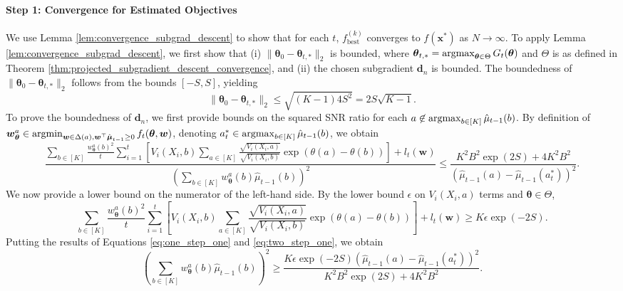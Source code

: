 \documentclass{article}
\begin{document}
\begin{appendices}
\paragraph{Step 1: Convergence for Estimated Objectives} We use Lemma \ref{lem:convergence_subgrad_descent} to show that for each $t$, $f_{\text{best}}^{(k)}$ converges to $f(\bm{x}^*)$ as $N \rightarrow \infty$. To apply Lemma \ref{lem:convergence_subgrad_descent}, we first show that (i) $\|\bm{\theta}_0 - \bm{\theta}_{t,*} \|_2$ is bounded, where $\bm{\theta}_{t,*} = \argmax_{\bm{\theta} \in \Theta} G_t(\bm{\theta})$ and $\Theta$ is as defined in Theorem \ref{thm:projected_subgradient_descent_convergence}, and (ii) the chosen subgradient $\bm{d}_n$ is bounded. The boundedness of $\| \bm\theta_0 - \bm{\theta}_{t, *}\|_2$ follows from the bounds $[-S,S]$, yielding
\begin{equation}
    \| \bm\theta_0 - \bm\theta_{t, *}\|_2 \leq \sqrt{(K-1)4S^2} = 2S\sqrt{K-1}.
\end{equation}
To prove the boundedness of $\bm{d}_n$, we first provide bounds on the squared SNR ratio for each $a \not\in \argmax_{b \in [K]} \hat\mu_{t-1}(b)$. By definition of $\bm{w}_{\bm{\theta}}^a \in \argmin_{\bm{w} \in \Delta(a), \bm{w}^\top \hat{\bm{\mu}}_{t-1}\geq 0} f_t(\bm{\theta}, \bm{w})$, denoting $a_t^* \in \argmax_{b \in [K]} \hat\mu_{t-1}(b)$, we obtain
\begin{equation}\label{eq:one_step_one}
    \frac{\sum_{b \in [K]} \frac{w_{\bm{\theta}}^{a}(b)^2}{t} \sum_{i=1}^t\left[V_i(X_i,b)\sum_{a \in [K]}\frac{ \sqrt{V_i(X_i,a) } }{\sqrt{V_i(X_i,b) } }\exp\left(\theta(a) - \theta(b)\right)\right] + l_t(\bm{w})}{\left(\sum_{b \in [K]} w_{\bm\theta}^a(b)\hat\mu_{t-1}(b) \right)^2} \leq \frac{K^2B^2\exp(2S)+ 4K^2B^2}{\left(\hat\mu_{t-1}(a) - \hat\mu_{t-1}(a_t^*)\right)^2}.
\end{equation}
We now provide a lower bound on the numerator of the left-hand side. By the lower bound $\epsilon$ on $V_i(X_i, a)$ terms and $\bm{\theta} \in \Theta$, 
\begin{equation}\label{eq:two_step_one}
    \sum_{b \in [K]} \frac{w_{\bm{\theta}}^{a}(b)^2}{t} \sum_{i=1}^t\left[V_i(X_i,b)\sum_{a \in [K]}\frac{ \sqrt{V_i(X_i,a) } }{\sqrt{V_i(X_i,b) } }\exp\left(\theta(a) - \theta(b)\right)\right] + l_t(\bm{w}) \geq K\epsilon\exp(-2S).
\end{equation}
Putting the results of Equations \eqref{eq:one_step_one} and \eqref{eq:two_step_one}, we obtain
\begin{equation}\label{eq:bounds_on_mean}
    \left(\sum_{b \in [K]} w_{\bm\theta}^a(b)\hat\mu_{t-1}(b) \right)^2 \geq \frac{K\epsilon\exp(-2S)\left(\hat\mu_{t-1}(a) - \hat\mu_{t-1}(a_t^*)\right)^2}{K^2B^2\exp(2S)+ 4K^2B^2}.

\end{equation}
\end{appendices}
\end{document}
